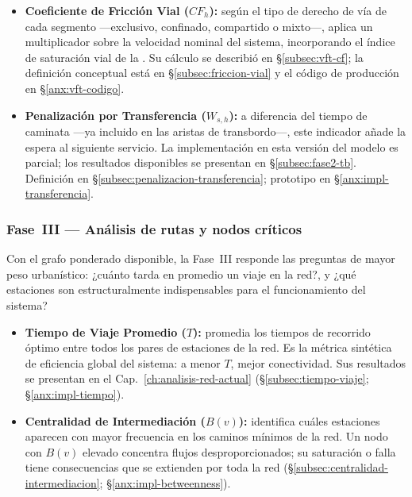 \begin{itemize}
    \item \textbf{Coeficiente de Fricción Vial ($CF_h$):} según el tipo de
    derecho de vía de cada segmento —exclusivo, confinado, compartido o
    mixto—, aplica un multiplicador sobre la velocidad nominal del sistema,
    incorporando el índice de saturación vial de la \zmvm{}. Su cálculo se
    describió en §\ref{subsec:vft-cf}; la definición conceptual está en
    §\ref{subsec:friccion-vial} y el código de producción en §\ref{anx:vft-codigo}.

    \item \textbf{Penalización por Transferencia ($W_{s,h}$):} a diferencia del
    tiempo de caminata —ya incluido en las aristas de transbordo—, este
    indicador añade la espera al siguiente servicio. La implementación en esta
    versión del modelo es parcial; los resultados disponibles se presentan en
    §\ref{subsec:fase2-tb}. Definición en
    §\ref{subsec:penalizacion-transferencia}; prototipo en
    §\ref{anx:impl-transferencia}.
\end{itemize}

\subsubsection*{Fase~III — Análisis de rutas y nodos críticos}

Con el grafo ponderado disponible, la Fase~III responde las preguntas de mayor
peso urbanístico: ¿cuánto tarda en promedio un viaje en la red?, y ¿qué
estaciones son estructuralmente indispensables para el funcionamiento del
sistema?

\begin{itemize}
    \item \textbf{Tiempo de Viaje Promedio ($T$):} promedia los tiempos de
    recorrido óptimo entre todos los pares de estaciones de la red. Es la
    métrica sintética de eficiencia global del sistema: a menor $T$, mejor
    conectividad. Sus resultados se presentan en el Cap.~\ref{ch:analisis-red-actual}
    (§\ref{subsec:tiempo-viaje}; §\ref{anx:impl-tiempo}).

    \item \textbf{Centralidad de Intermediación ($B(v)$):} identifica cuáles
    estaciones aparecen con mayor frecuencia en los caminos mínimos de la red.
    Un nodo con $B(v)$ elevado concentra flujos desproporcionados; su
    saturación o falla tiene consecuencias que se extienden por toda la red
    (§\ref{subsec:centralidad-intermediacion}; §\ref{anx:impl-betweenness}).
\end{itemize}


